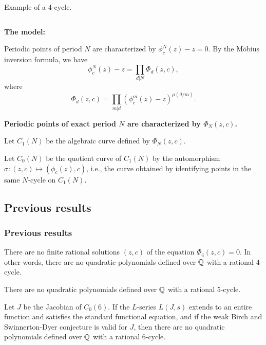 \documentclass[aspectratio=1610]{beamer}
\begin{document}
\begin{frame}
\begin{minipage}{\textwidth}
\begin{columns}
\begin{column}{0.2\textwidth}
        Example of a 4-cycle.
      \end{column}
    \end{columns}
  \end{minipage}

  \pause

  \begin{minipage}{\textwidth}
    \textbf{The model:}

    Periodic points of period $N$ are characterized by $\phi_c^N(z) -
    z = 0$. By the M\"obius inversion formula, we have
    \[
    \phi_c^N(z) - z = \prod_{d|N} \Phi_d(z, c),
    \]
    where
    \[
    \Phi_d(z, c) = \prod_{m|d}(\phi_c^m(z) - z)^{\mu(d/m)}.
    \]

    \pause

    \textbf{Periodic points of exact period $N$ are characterized by
      $\Phi_N(z, c)$.}

    Let $C_1(N)$ be the algebraic curve defined by $\Phi_N(z, c)$.

    Let $C_0(N)$ be the quotient curve of $C_1(N)$ by the automorphism
    $\sigma: (z, c) \mapsto (\phi_c(z), c)$, i.e., the curve obtained
    by identifying points in the same $N$-cycle on $C_1(N)$.
  \end{minipage}
\end{frame}

\subsection{Previous results}

\begin{frame}
  \frametitle{Previous results}
  \begin{theorem}
    There are no finite rational solutions $(z, c)$ of the equation
    $\Phi_4(z, c) = 0$. In other words, there are no quadratic
    polynomials defined over $\mathbb{Q}$ with a rational 4-cycle.
  \end{theorem}

  \begin{theorem}
    There are no quadratic polynomials defined over $\mathbb{Q}$ with a
    rational 5-cycle.
  \end{theorem}

  \begin{theorem}
    Let $J$ be the Jacobian of $C_0(6)$. If the $L$-series $L(J,s)$
    extends to an entire function and satisfies the standard
    functional equation, and if the weak Birch and Swinnerton-Dyer
    conjecture is valid for $J$, then there are no quadratic
    polynomials defined over $\mathbb{Q}$ with a rational 6-cycle.
  \end{theorem}
\end{frame}
\end{document}

